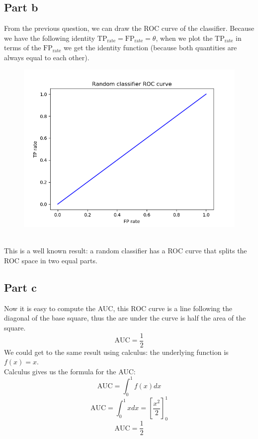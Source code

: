 \documentclass[a4paper, 10pt]{article}
\begin{document}
\subsection{Part b}
From the previous question, we can draw the ROC curve of the classifier.
Because we have the following identity $\text{TP}_\text{rate} = \text{FP}_\text{rate} = \theta$,
when we plot the $\text{TP}_\text{rate}$ in terms of the $\text{FP}_\text{rate}$ we get
the identity function (because both quantities are always equal to each other).
\\
\begin{figure}
\centering
	\includegraphics[scale=0.7]{ex2b}
\end{figure}
\\
This is a well known result: a random classifier has a ROC curve that
splits the ROC space in two equal parts.

\subsection{Part c}
Now it is easy to compute the AUC, this ROC curve is a line
following the diagonal of the base square, thus the are under the curve is
half the area of the square.
$$
\text{AUC} = \frac{1}{2}
$$
We could get to the same result using calculus: the underlying function
is $f(x) = x$.
\\
Calculus gives us the formula for the AUC:
$$
\text{AUC} = \int_0^1 f(x) dx
$$
$$
\text{AUC} = \int_0^1 x dx = \left[\frac{x^2}{2} \right]_0^1 
$$
$$
\text{AUC} = \frac{1}{2}
$$
\end{document}
